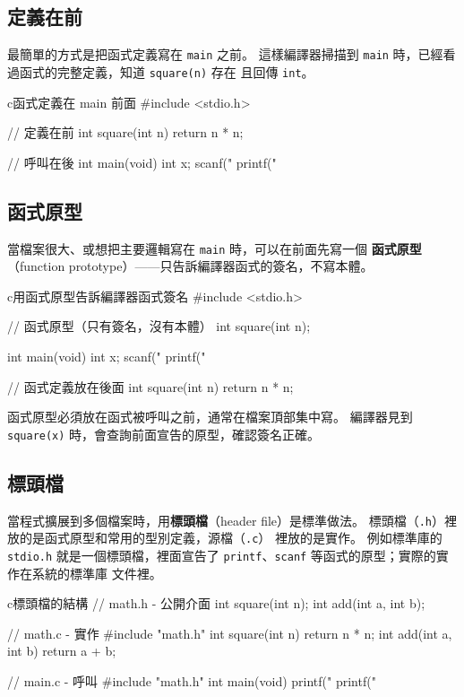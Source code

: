 \subsection{定義在前}

最簡單的方式是把函式定義寫在 \texttt{main} 之前。 這樣編譯器掃描到
\texttt{main} 時，已經看過函式的完整定義，知道 \texttt{square(n)} 存在
且回傳 \texttt{int}。

\begin{code}{c}{函式定義在 main 前面}
#include <stdio.h>

// 定義在前
int square(int n) {
    return n * n;
}

// 呼叫在後
int main(void) {
    int x;
    scanf("%
    printf("%
}
\end{code}

\subsection{函式原型}

當檔案很大、或想把主要邏輯寫在 \texttt{main} 時，可以在前面先寫一個
\textbf{函式原型}（function prototype）——只告訴編譯器函式的簽名，不寫本體。

\begin{code}{c}{用函式原型告訴編譯器函式簽名}
#include <stdio.h>

// 函式原型（只有簽名，沒有本體）
int square(int n);

int main(void) {
    int x;
    scanf("%
    printf("%
}

// 函式定義放在後面
int square(int n) {
    return n * n;
}
\end{code}

函式原型必須放在函式被呼叫之前，通常在檔案頂部集中寫。 編譯器見到
\texttt{square(x)} 時，會查詢前面宣告的原型，確認簽名正確。

\subsection{標頭檔}

當程式擴展到多個檔案時，用\textbf{標頭檔}（header file）是標準做法。
標頭檔（\texttt{.h}）裡放的是函式原型和常用的型別定義，源檔（\texttt{.c}）
裡放的是實作。 例如標準庫的 \texttt{stdio.h} 就是一個標頭檔，裡面宣告了
\texttt{printf}、\texttt{scanf} 等函式的原型；實際的實作在系統的標準庫
文件裡。

\begin{code}{c}{標頭檔的結構}
// math.h - 公開介面
int square(int n);
int add(int a, int b);

// math.c - 實作
#include "math.h"
int square(int n) {
    return n * n;
}
int add(int a, int b) {
    return a + b;
}

// main.c - 呼叫
#include "math.h"
int main(void) {
    printf("%
    printf("%
}
\end{code}

